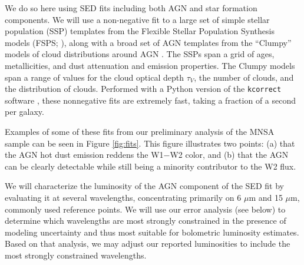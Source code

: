 \documentclass[12pt, preprint]{hacked-aastex}
\begin{document}

We do so here using SED fits including both AGN and star formation
components. We will use a non-negative fit to a large set of simple
stellar population (SSP) templates from the Flexible Stellar
Population Synthesis models (FSPS; \cite{conroy09a}), along with a
broad set of AGN templates from the ``Clumpy'' models of cloud
distributions around AGN \cite{nenkova08a}. The SSPs span a grid of
ages, metallicities, and dust attenuation and emission properties. The
Clumpy models span a range of values for the cloud optical depth
$\tau_V$, the number of clouds, and the distribution of
clouds. Performed with a Python version of the {\tt kcorrect} software
\cite{blanton07b}, these nonnegative fits are extremely fast, taking a
fraction of a second per galaxy.

Examples of some of these fits from our preliminary analysis of the
MNSA sample can be seen in Figure \ref{fig:fits}. This figure
illustrates two points: (a) that the AGN hot dust emission reddens the
W1$-$W2 color, and (b) that the AGN can be clearly detectable while
still being a minority contributor to the W2 flux.

We will characterize the luminosity of the AGN component of the SED
fit by evaluating it at several wavelengths, concentrating primarily
on 6 $\mu$m and 15 $\mu$m, commonly used reference points. We will use
our error analysis (see below) to determine which wavelengths are most
strongly constrained in the presence of modeling uncertainty and thus
most suitable for bolometric luminosity estimates. Based on that
analysis, we may adjust our reported luminosities to include the most
strongly constrained wavelengths.
\end{document}
